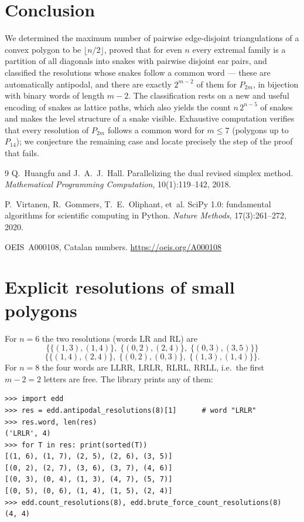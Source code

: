 \documentclass[11pt,a4paper]{article}
\theoremstyle{definition}
\theoremstyle{remark}
\newcommand{\Li}{\mathrm{L}}
\newcommand{\Ri}{\mathrm{R}}
\begin{document}
\section{Conclusion}

We determined the maximum number of pairwise edge-disjoint triangulations of a convex
polygon to be $\lfloor n/2\rfloor$, proved that for even $n$ every extremal family is a
partition of all diagonals into snakes with pairwise disjoint ear pairs, and classified the
resolutions whose snakes follow a common word --- these are automatically antipodal, and
there are exactly $2^{m-2}$ of them for $P_{2m}$, in bijection with binary words of length
$m-2$.  The classification rests on a
new and useful encoding of snakes as lattice paths, which also yields the count
$n\,2^{n-5}$ of snakes and makes the level structure of a snake visible.  Exhaustive
computation verifies that every resolution of $P_{2m}$ follows a common word for $m\le7$
(polygons up to $P_{14}$); we conjecture the remaining case and locate precisely the step of
the proof that fails.

\begin{thebibliography}{9}
Q.~Huangfu and J.~A.~J.~Hall.
\newblock Parallelizing the dual revised simplex method.
\newblock \emph{Mathematical Programming Computation}, 10(1):119--142, 2018.

P.~Virtanen, R.~Gommers, T.~E.~Oliphant, et~al.
\newblock SciPy 1.0: fundamental algorithms for scientific computing in Python.
\newblock \emph{Nature Methods}, 17(3):261--272, 2020.

OEIS~A000108, Catalan numbers.
\newblock \url{https://oeis.org/A000108}
\end{thebibliography}

\appendix

\section{Explicit resolutions of small polygons}\label{app:examples}

For $n=6$ the two resolutions (words $\Li\Ri$ and $\Ri\Li$) are
{\small
\[
  \{\{(1,3),(1,4)\},\;\{(0,2),(2,4)\},\;\{(0,3),(3,5)\}\}
\]
\[
  \{\{(1,4),(2,4)\},\;\{(0,2),(0,3)\},\;\{(1,3),(1,4)\}\}.
\]
}
For $n=8$ the four words are $\Li\Li\Ri\Ri,\ \Li\Ri\Li\Ri,\ \Ri\Li\Ri\Li,\
\Ri\Ri\Li\Li$, i.e.\ the first $m-2=2$ letters are free.  The library prints any of them:

{\small
\begin{verbatim}
>>> import edd
>>> res = edd.antipodal_resolutions(8)[1]      # word "LRLR"
>>> res.word, len(res)
('LRLR', 4)
>>> for T in res: print(sorted(T))
[(1, 6), (1, 7), (2, 5), (2, 6), (3, 5)]
[(0, 2), (2, 7), (3, 6), (3, 7), (4, 6)]
[(0, 3), (0, 4), (1, 3), (4, 7), (5, 7)]
[(0, 5), (0, 6), (1, 4), (1, 5), (2, 4)]
>>> edd.count_resolutions(8), edd.brute_force_count_resolutions(8)
(4, 4)
\end{verbatim}
}
\end{document}
